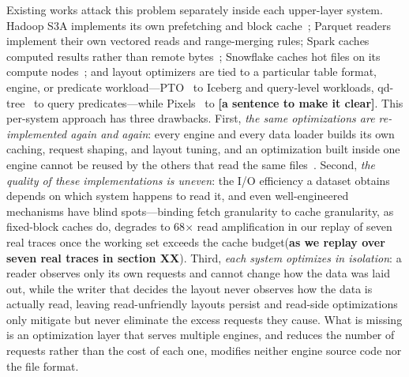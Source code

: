 Existing works attack this problem separately inside each upper-layer system. Hadoop S3A implements its own prefetching and block cache~\cite{s3aprefetch};
Parquet readers implement their own vectored reads and range-merging rules;
Spark caches computed results rather than remote bytes~\cite{rdd}; Snowflake
caches hot files on its compute nodes~\cite{snowflake}; and layout optimizers
are tied to a particular table format, engine, or predicate
workload---PTO~\cite{pto} to Iceberg and query-level workloads,
qd-tree~\cite{qdtree} to query predicates---while Pixels~\cite{pixels} to \textbf{[a sentence to make it clear]}. This per-system approach has three
drawbacks. First, \emph{the same optimizations are re-implemented again and
again}: every engine and every data loader builds its own caching, request
shaping, and layout tuning, and an optimization built inside one engine cannot
be reused by the others that read the same files~\cite{activedatalakes}.
Second, \emph{the quality of these implementations is uneven}: the I/O
efficiency a dataset obtains depends on which system happens to read it, and
even well-engineered mechanisms have blind spots---binding fetch granularity
to cache granularity, as fixed-block caches do, degrades to 68$\times$ read
amplification in our replay of seven real traces once the working set exceeds
the cache budget(\textbf{as we replay over seven real traces in section XX}). Third, \emph{each system optimizes in isolation}: a reader
observes only its own requests and cannot change how the data was laid out,
while the writer that decides the layout never observes how the data is
actually read, leaving read-unfriendly layouts persist and read-side
optimizations only mitigate but never eliminate the excess requests they
cause. What is missing is an optimization layer that serves multiple engines, and reduces the number of requests rather than the cost of each one, modifies neither engine source code nor the file format.

